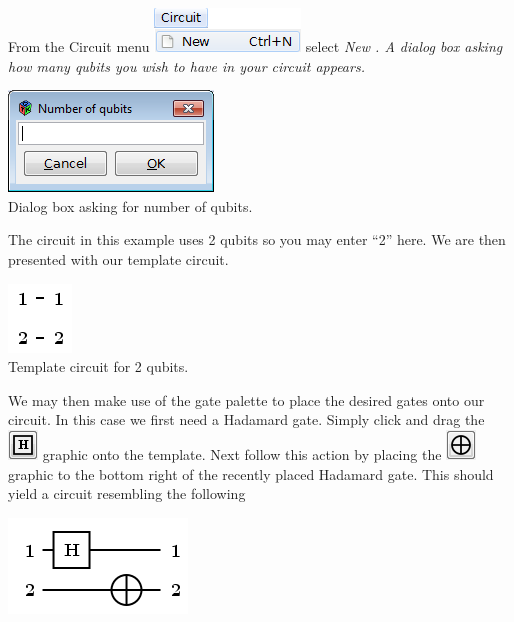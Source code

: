 \documentclass[10pt]{article}
\theoremstyle{definition}
\begin{document}
From the Circuit menu \includegraphics{Figures/CreateCircuit/New.png} select \em New \em. A dialog box asking how many qubits you wish to have in your circuit appears. 

\begin{center}
\includegraphics{Figures/CreateCircuit/NumberOfQubits.png}\\
Dialog box asking for number of qubits.
\end{center}

The circuit in this example uses 2 qubits so you may enter ``2'' here. We are then presented with our template circuit.

\begin{center}
\includegraphics[scale=.7]{Figures/CreateCircuit/TemplateCircuit}\\
Template circuit for 2 qubits.
\end{center}

We may then make use of the gate palette to place the desired gates onto our circuit. In this case we first need a Hadamard gate. Simply click and drag the \includegraphics{Figures/Gates/Hadamard.png} graphic onto the template. Next follow this action by placing the \includegraphics{Figures/Gates/Mod2.png} graphic to the bottom right of the recently placed Hadamard gate. This should yield a circuit resembling the following

\begin{center}
\includegraphics[scale=.7]{Figures/CreateCircuit/EPRCircuit2}
\end{center}
\end{document}
